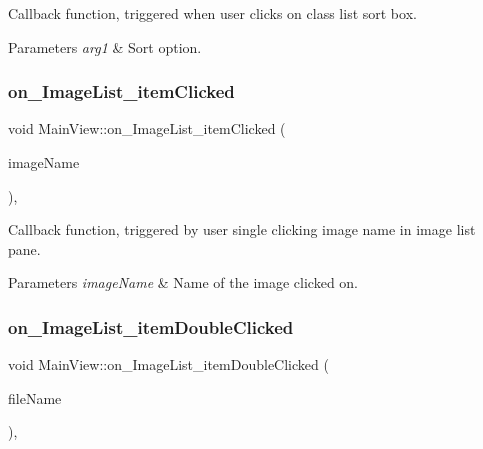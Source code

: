 Callback function, triggered when user clicks on class list sort box. 


\begin{DoxyParams}{Parameters}
{\em arg1} & Sort option. \\
\hline
\end{DoxyParams}
\mbox{\label{classMainView_a21afbf21cbe8fc3e444d57cd575e69b0}} 
\subsubsection{\texorpdfstring{on\+\_\+\+Image\+List\+\_\+item\+Clicked}{on\_ImageList\_itemClicked}}
{\footnotesize\ttfamily void Main\+View\+::on\+\_\+\+Image\+List\+\_\+item\+Clicked (\begin{DoxyParamCaption}\item[{Q\+List\+Widget\+Item $\ast$}]{image\+Name }\end{DoxyParamCaption})\hspace{0.3cm}{\ttfamily [private]}, {\ttfamily [slot]}}



Callback function, triggered by user single clicking image name in image list pane. 


\begin{DoxyParams}{Parameters}
{\em image\+Name} & Name of the image clicked on. \\
\hline
\end{DoxyParams}
\mbox{\label{classMainView_ae0af943bbf0d0806261bb8aa5444eb5b}} 
\subsubsection{\texorpdfstring{on\+\_\+\+Image\+List\+\_\+item\+Double\+Clicked}{on\_ImageList\_itemDoubleClicked}}
{\footnotesize\ttfamily void Main\+View\+::on\+\_\+\+Image\+List\+\_\+item\+Double\+Clicked (\begin{DoxyParamCaption}\item[{Q\+List\+Widget\+Item $\ast$}]{file\+Name }\end{DoxyParamCaption})\hspace{0.3cm}{\ttfamily [private]}, {\ttfamily [slot]}}




